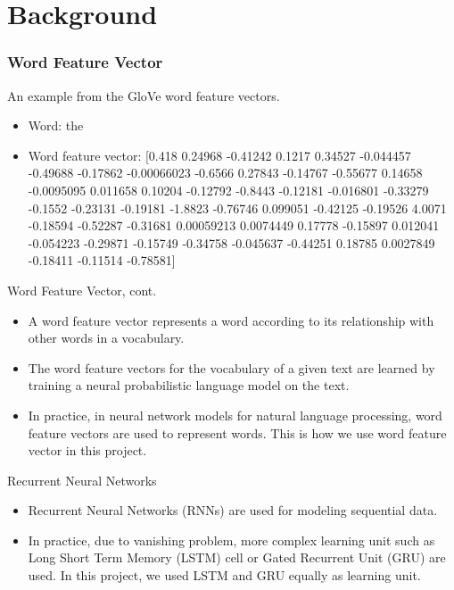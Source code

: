 \documentclass{beamer}
\begin{document}
\section{Background}

\begin{frame} \frametitle{Word Feature Vector}
  \begin{examples}
  An example from the GloVe word feature vectors.
    \begin{itemize}
        \item Word: the
        \item Word feature vector: [0.418 0.24968 -0.41242 0.1217 0.34527 -0.044457 -0.49688 -0.17862 -0.00066023 -0.6566 0.27843 -0.14767 -0.55677 0.14658 -0.0095095 0.011658 0.10204 -0.12792 -0.8443 -0.12181 -0.016801 -0.33279 -0.1552 -0.23131 -0.19181 -1.8823 -0.76746 0.099051 -0.42125 -0.19526 4.0071 -0.18594 -0.52287 -0.31681 0.00059213 0.0074449 0.17778 -0.15897 0.012041 -0.054223 -0.29871 -0.15749 -0.34758 -0.045637 -0.44251 0.18785 0.0027849 -0.18411 -0.11514 -0.78581]
    \end{itemize}
  \end{examples}
\end{frame}


\begin{frame}{Word Feature Vector, cont.}
\begin{itemize}
      \item A word feature vector represents a word according to its relationship with other words in a vocabulary.
      \item The word feature vectors for the vocabulary of a given text are learned by training a neural probabilistic language model on the text.
      \item In practice, in neural network models for natural language processing, word feature vectors are used to represent words. This is how we use word feature vector in this project.
  \end{itemize}
\end{frame}



\begin{frame}{Recurrent Neural Networks}

    \begin{itemize}
        \item Recurrent Neural Networks (RNNs) are used for modeling sequential data.
        \item In practice, due to vanishing problem, more complex learning unit such as Long Short Term Memory (LSTM) cell or Gated Recurrent Unit (GRU) are used. In this project, we used LSTM and GRU equally as learning unit.
    \end{itemize}



\end{frame}
\end{document}
